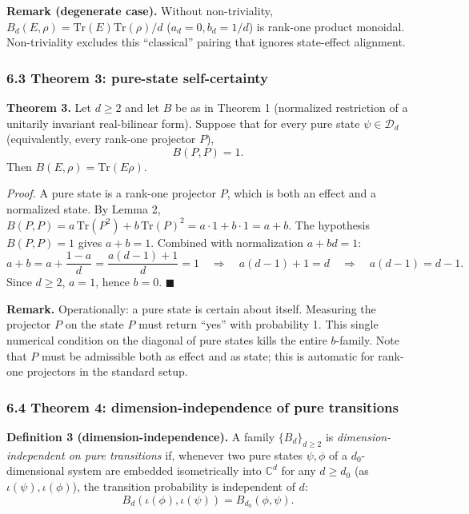 \documentclass[
]{article}
\begin{document}
\textbf{Remark (degenerate case).} Without non-triviality,
\(B_d(E,\rho)=\mathrm{Tr}(E)\mathrm{Tr}(\rho)/d\) (\(a_d=0,b_d=1/d\)) is
rank-one product monoidal. Non-triviality excludes this ``classical''
pairing that ignores state-effect alignment.

\subsubsection{6.3 Theorem 3: pure-state
self-certainty}\label{theorem-3-pure-state-self-certainty}

\textbf{Theorem 3.} Let \(d\geq 2\) and let \(B\) be as in Theorem 1
(normalized restriction of a unitarily invariant real-bilinear form).
Suppose that for every pure state \(\psi\in\mathcal D_d\) (equivalently,
every rank-one projector \(P\)), \[B(P,P)=1.\] Then
\(B(E,\rho)=\mathrm{Tr}(E\rho)\).

\emph{Proof.} A pure state is a rank-one projector \(P\), which is both
an effect and a normalized state. By Lemma 2,
\(B(P,P)=a\,\mathrm{Tr}(P^2)+b\,\mathrm{Tr}(P)^2=a\cdot 1+b\cdot 1=a+b\).
The hypothesis \(B(P,P)=1\) gives \(a+b=1\). Combined with normalization
\(a+bd=1\):
\[a+b=a+\frac{1-a}{d}=\frac{a(d-1)+1}{d}=1\quad\Rightarrow\quad a(d-1)+1=d\quad\Rightarrow\quad a(d-1)=d-1.\]
Since \(d\geq 2\), \(a=1\), hence \(b=0\). \(\blacksquare\)

\textbf{Remark.} Operationally: a pure state is certain about itself.
Measuring the projector \(P\) on the state \(P\) must return ``yes''
with probability 1. This single numerical condition on the diagonal of
pure states kills the entire \(b\)-family. Note that \(P\) must be
admissible both as effect and as state; this is automatic for rank-one
projectors in the standard setup.

\subsubsection{6.4 Theorem 4: dimension-independence of pure
transitions}\label{theorem-4-dimension-independence-of-pure-transitions}

\textbf{Definition 3 (dimension-independence).} A family
\(\{B_d\}_{d\geq 2}\) is \emph{dimension-independent on pure
transitions} if, whenever two pure states \(\psi,\phi\) of a
\(d_0\)-dimensional system are embedded isometrically into
\(\mathbb C^d\) for any \(d\geq d_0\) (as \(\iota(\psi),\iota(\phi)\)),
the transition probability is independent of \(d\):
\[B_d(\iota(\phi),\iota(\psi))=B_{d_0}(\phi,\psi).\]
\end{document}
